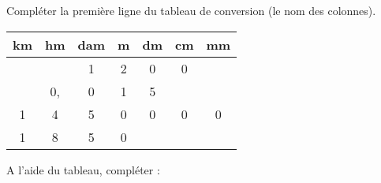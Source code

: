 \begin{questions}
	\question Compléter la première ligne du tableau de conversion (le nom des colonnes).
	\begin{solution}
		\begin{center}
			\begin{tabular}{|@{\ \ \ }c@{\ \ \ }|@{\ \ \ }c@{\ \ \ }|@{\ \ \ }c@{\ \ \ }|@{\ \ \ }c@{\ \ \ }|@{\ \ \ }c@{\ \ \ }|@{\ \ \ }c@{\ \ \ }|@{\ \ \ }c@{\ \ \ }|}
				\hline
				\textbf{km} & \textbf{hm} & \textbf{dam} & \textbf{m} & \textbf{dm} & \textbf{cm} & \textbf{mm} \\ \hline
				&             & 1            & 2          & 0           & 0           &             \\ \hline
				& 0,          & 0            & 1          & 5           &             &             \\ \hline
				1           & 4           & 5            & 0          & 0           & 0           & 0           \\ \hline
				1           & 8          & 5            & 0          &             &             &             \\ \hline
			\end{tabular}
		\end{center}
	\end{solution}
	
	\question A l'aide du tableau, compléter :
		\begin{parts}
\end{parts}
\end{questions}
